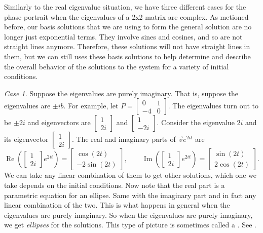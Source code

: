 \documentclass{ximera}
\begin{document}
Similarly to the real eigenvalue situation, we have three different cases for the phase portrait when the eigenvalues of a 2x2 matrix are complex. As metioned before, our basis solutions that we are using to form the general solution are no longer just exponential terms. They involve sines and cosines, and so are not straight lines anymore. Therefore, these solutions will not have straight lines in them, but we can still uses these basis solutions to help determine and describe the overall behavior of the solutions to the system for a variety of initial conditions. 

\emph{Case 1.} Suppose the eigenvalues are purely imaginary. That is, suppose the eigenvalues are $\pm ib$.  For example, let $P = \left[ \begin{smallmatrix} 0 & 1 \\ -4 & 0 \end{smallmatrix} \right]$. The eigenvalues turn out to be $\pm 2i$ and eigenvectors are $\left[ \begin{smallmatrix} 1 \\ 2i \end{smallmatrix} \right]$ and $\left[ \begin{smallmatrix} 1 \\ -2i \end{smallmatrix} \right]$.  Consider the eigenvalue $2i$ and its eigenvector $\left[ \begin{smallmatrix} 1 \\ 2i \end{smallmatrix} \right]$. The real and imaginary parts of $\vec{v} e^{2it}$ are 
\begin{equation*}
    \operatorname{Re} \left(
    \begin{bmatrix} 
        1 \\ 
        2i 
    \end{bmatrix} 
    e^{2it}\right) =
    \begin{bmatrix} 
        \cos (2t) \\ 
        -2 \sin (2t)  
    \end{bmatrix} ,
    \qquad \operatorname{Im} \left(
    \begin{bmatrix} 
        1 \\ 
        2i 
    \end{bmatrix} 
    e^{2it}\right) =
    \begin{bmatrix} 
        \sin (2t) \\ 
        2 \cos (2t) 
    \end{bmatrix} .
\end{equation*}
We can take any linear combination of them to get other solutions, which one we take depends on the initial conditions.  Now note that the real part is a parametric equation for an ellipse.  Same with the imaginary part and in fact any linear combination of the two. This is what happens in general when the eigenvalues are purely imaginary. So when the eigenvalues are purely imaginary, we get \emph{ellipses} for the solutions.  This type of picture is sometimes called a \emph{}.  See . 
\end{document}
